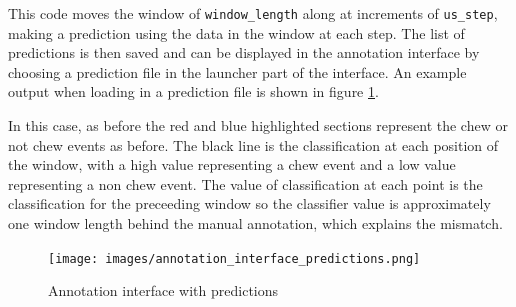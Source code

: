 This code moves the window of \texttt{window\_length} along at increments of \texttt{us\_step}, making a prediction using the data in the window at each step. The list of predictions is then saved and can be displayed in the annotation interface by choosing a prediction file in the launcher part of the interface. An example output when loading in a prediction file is shown in figure \ref{interfaceprediction}.

In this case, as before the red and blue highlighted sections represent the chew or not chew events as before. The black line is the classification at each position of the window, with a high value representing a chew event and a low value representing a non chew event. The value of classification at each point is the classification for the preceeding window so the classifier value is approximately one window length behind the manual annotation, which explains the mismatch.

\begin{figure}[ht!]
\begin{center}
\leavevmode
\texttt{[image: images/annotation\_interface\_predictions.png]}
\end{center}
\caption{Annotation interface with predictions}
\label{interfaceprediction}
\end{figure}




